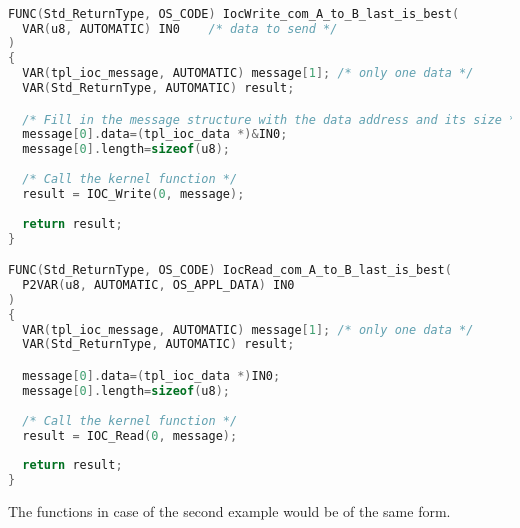 \begin{lstlisting}[language=C]

FUNC(Std_ReturnType, OS_CODE) IocWrite_com_A_to_B_last_is_best(
  VAR(u8, AUTOMATIC) IN0	/* data to send */
)
{
  VAR(tpl_ioc_message, AUTOMATIC) message[1]; /* only one data */
  VAR(Std_ReturnType, AUTOMATIC) result;

  /* Fill in the message structure with the data address and its size */
  message[0].data=(tpl_ioc_data *)&IN0;
  message[0].length=sizeof(u8);
  
  /* Call the kernel function */
  result = IOC_Write(0, message); 
  
  return result;
}

FUNC(Std_ReturnType, OS_CODE) IocRead_com_A_to_B_last_is_best(
  P2VAR(u8, AUTOMATIC, OS_APPL_DATA) IN0
)
{
  VAR(tpl_ioc_message, AUTOMATIC) message[1]; /* only one data */
  VAR(Std_ReturnType, AUTOMATIC) result;

  message[0].data=(tpl_ioc_data *)IN0;
  message[0].length=sizeof(u8);
  
  /* Call the kernel function */
  result = IOC_Read(0, message);
  
  return result;
}

\end{lstlisting}

The functions in case of the second example would be of the same form.